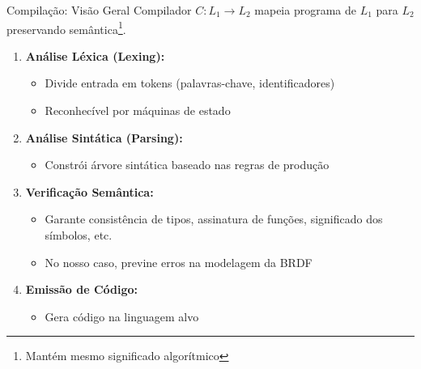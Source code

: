 \begin{frame}{Compilação: Visão Geral}
    Compilador $C: L_1 \rightarrow L_2$ mapeia programa de $L_1$ para $L_2$ preservando semântica\footnote{\tiny{Mantém mesmo significado algorítmico}}.

    \begin{enumerate}

        \item \textbf{Análise Léxica (Lexing):}
              \begin{itemize}
                  \item Divide entrada em tokens (palavras-chave, identificadores)
                  \item Reconhecível por máquinas de estado
              \end{itemize}
        \item \textbf{Análise Sintática (Parsing):}
              \begin{itemize}
                  \item Constrói árvore sintática baseado nas regras de produção
              \end{itemize}
        \item \textbf{Verificação Semântica:}
              \begin{itemize}
                  \item Garante consistência de tipos, assinatura de funções, significado dos símbolos, etc.
                  \item No nosso caso, previne erros na modelagem da BRDF
              \end{itemize}
        \item \textbf{Emissão de Código:}
              \begin{itemize}
                  \item Gera código na linguagem alvo
              \end{itemize}
    \end{enumerate}
\end{frame}

